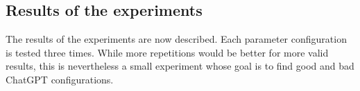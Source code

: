 \begin{comment}
\subsection{Requesting follow-ups}

As outlined in section \ref{sec:chain of thought},  one prompt might no be enough to refactor data clumps. This might also apply for the simpler task of detecting data clumps.

Instead of expecting that a single request will detect all data clumps, another approach would be to repeat the same requests multiple times and aggregate the results. These follow-up prompts result in ChatGPT to re-analyze the code so that more data clumps can be found. 

The issue  with follow-up prompts is how often should a prompt be repeated. Each prompt repeat requires that the conversation history to be sent again because ChatGPT is stateless. This leads to higher resource usage and costs. There are multiple approach to implement follow up.

\begin{description}
\item[Full project follow-up] The whole project (all relevant files) is sent to  ChatGPT again with an instruction to find more data clumps. As a result, more data is sent per  request while the number of request can be reduced. As a  result, ChatGPt might find additional data clumps that it has not found during the previous prompts.
\item [Tuple-based follow-up] A tuple of two files in the project (i.~e. the content of those files) is sent again to ChatGPT with the instruction to find more data clumps. If the goal is to data clumps between tuples of all files, $0.5*n*(n-1)$ file tuples need to uploaded so that many requests will needed. However, this can help ChatGPT to focus on a smaller part of the software project to analyze in order to find more data clumps.
\end{description}
\end{comment}

\subsection{Results of the experiments}\label{sec:initial_experiments}

The results of the experiments are now described. Each parameter configuration is tested three times. While more repetitions would be better for more valid results, this is nevertheless a small experiment whose goal is to find good and bad ChatGPT configurations. 

